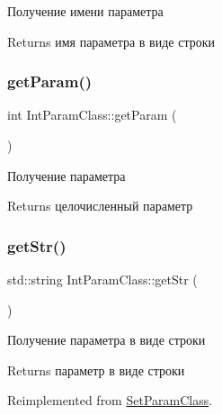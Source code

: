 Получение имени параметра 

\begin{DoxyReturn}{Returns}
имя параметра в виде строки 
\end{DoxyReturn}
\mbox{\label{class_int_param_class_a9a3aad6c9c11c583955288c328dbede3}} 
\subsubsection{\texorpdfstring{get\+Param()}{getParam()}}
{\footnotesize\ttfamily int Int\+Param\+Class\+::get\+Param (\begin{DoxyParamCaption}{ }\end{DoxyParamCaption})}



Получение параметра 

\begin{DoxyReturn}{Returns}
целочисленный параметр 
\end{DoxyReturn}
\mbox{\label{class_int_param_class_a63e23466747d1303a7ed40fd23edbbb1}} 
\subsubsection{\texorpdfstring{get\+Str()}{getStr()}}
{\footnotesize\ttfamily std\+::string Int\+Param\+Class\+::get\+Str (\begin{DoxyParamCaption}{ }\end{DoxyParamCaption})\hspace{0.3cm}{\ttfamily [virtual]}}



Получение параметра в виде строки 

\begin{DoxyReturn}{Returns}
параметр в виде строки 
\end{DoxyReturn}


Reimplemented from \hyperlink{class_set_param_class_a44f3924827807beb6805867a0305e8c9}{Set\+Param\+Class}.

\mbox{\label{class_set_param_class_aeabf85ad5a078ab4abb8f09a67f2c8e0}} 
